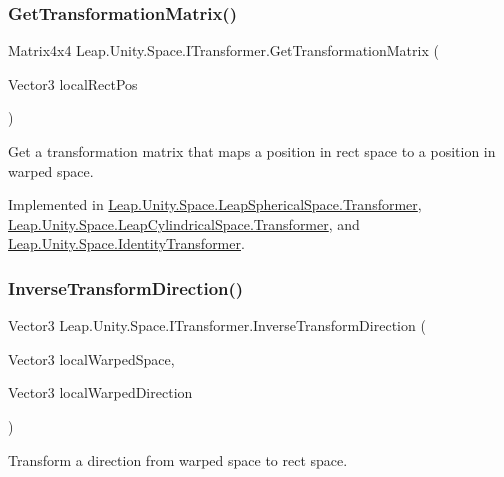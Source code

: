 \subsubsection{\texorpdfstring{GetTransformationMatrix()}{GetTransformationMatrix()}}
{\footnotesize\ttfamily Matrix4x4 Leap.\+Unity.\+Space.\+I\+Transformer.\+Get\+Transformation\+Matrix (\begin{DoxyParamCaption}\item[{Vector3}]{local\+Rect\+Pos }\end{DoxyParamCaption})}



Get a transformation matrix that maps a position in rect space to a position in warped space. 



Implemented in \mbox{\hyperlink{class_leap_1_1_unity_1_1_space_1_1_leap_spherical_space_1_1_transformer_aad315845425b24d3b09c62c49a7093ca}{Leap.\+Unity.\+Space.\+Leap\+Spherical\+Space.\+Transformer}}, \mbox{\hyperlink{class_leap_1_1_unity_1_1_space_1_1_leap_cylindrical_space_1_1_transformer_a9b84b4d4ae446344b19c6c6218e1a249}{Leap.\+Unity.\+Space.\+Leap\+Cylindrical\+Space.\+Transformer}}, and \mbox{\hyperlink{class_leap_1_1_unity_1_1_space_1_1_identity_transformer_a693ed0cac442e346b6bad9e1a5dc92a1}{Leap.\+Unity.\+Space.\+Identity\+Transformer}}.

\mbox{\label{interface_leap_1_1_unity_1_1_space_1_1_i_transformer_aa555a28ab51ed506732bb88756f06168}} 
\subsubsection{\texorpdfstring{InverseTransformDirection()}{InverseTransformDirection()}}
{\footnotesize\ttfamily Vector3 Leap.\+Unity.\+Space.\+I\+Transformer.\+Inverse\+Transform\+Direction (\begin{DoxyParamCaption}\item[{Vector3}]{local\+Warped\+Space,  }\item[{Vector3}]{local\+Warped\+Direction }\end{DoxyParamCaption})}



Transform a direction from warped space to rect space. 



